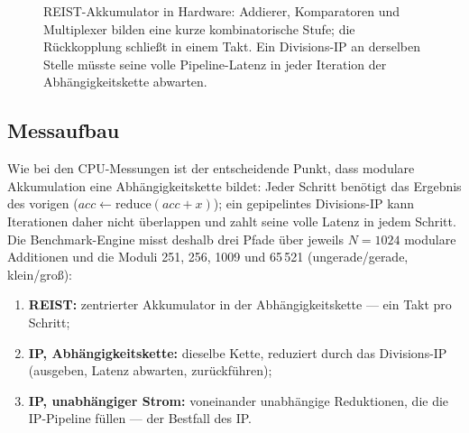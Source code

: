 \documentclass[11pt,a4paper]{scrartcl}
\theoremstyle{definition}
\theoremstyle{plain}
\theoremstyle{remark}
\begin{document}
\begin{figure}[htbp]
\centering
{}
\caption{REIST-Akkumulator in Hardware: Addierer, Komparatoren und Multiplexer bilden eine kurze kombinatorische Stufe; die Rückkopplung schließt in einem Takt. Ein Divisions-IP an derselben Stelle müsste seine volle Pipeline-Latenz in jeder Iteration der Abhängigkeitskette abwarten.}
\label{fig:fpgapfad}
\end{figure}

\subsection{Messaufbau}

Wie bei den CPU-Messungen ist der entscheidende Punkt, dass modulare Akkumulation eine Abhängigkeitskette bildet: Jeder Schritt benötigt das Ergebnis des vorigen ($acc \leftarrow \mathrm{reduce}(acc + x)$); ein gepipelintes Divisions-IP kann Iterationen daher nicht überlappen und zahlt seine volle Latenz in jedem Schritt. Die Benchmark-Engine misst deshalb drei Pfade über jeweils $N = 1024$ modulare Additionen und die Moduli 251, 256, 1009 und 65\,521 (ungerade/gerade, klein/groß):

\begin{enumerate}
\item \textbf{REIST:} zentrierter Akkumulator in der Abhängigkeitskette --- ein Takt pro Schritt;
\item \textbf{IP, Abhängigkeitskette:} dieselbe Kette, reduziert durch das Divisions-IP (ausgeben, Latenz abwarten, zurückführen);
\item \textbf{IP, unabhängiger Strom:} voneinander unabhängige Reduktionen, die die IP-Pipeline füllen --- der Bestfall des IP.
\end{enumerate}
\end{document}
